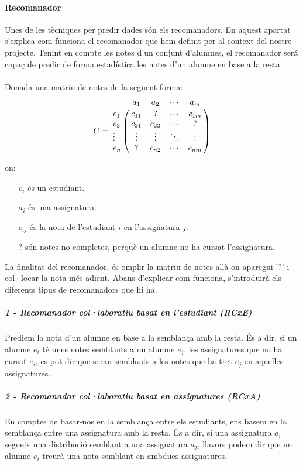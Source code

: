 \documentclass[12pt,a4paper,catalan]{article}
\begin{document}
\paragraph{Recomanador}
Unes de les tècniques per predir dades són els recomanadors. En aquest apartat s'explica com funciona el recomanador que hem definit per al context del nostre projecte. Tenint en compte les notes d'un conjunt d'alumnes, el recomanador será capaç de predir de forma estadística les notes d'un alumne en base a la resta.
\\
\\
Donada una matriu de notes de la següent forma:
$$
C = \bordermatrix{~ &         a_1   &    a_2   &   \cdots    &    a_m  \cr
                  e_1    &  c_{11}  &     ?    &   \cdots    &  c_{1m} \cr
                  e_2    &  c_{21}  &  c_{22}  &   \cdots    &    ?    \cr
                  \vdots &  \vdots  &  \vdots  &   \ddots    &  \vdots \cr
                  e_n    &    ?     &  c_{n2}  &   \cdots    &  c_{nm} \cr
                  }
$$

on:
\begin{itemize}[leftmargin=.5in]
	\item [$e_i$] és un estudiant.
	\item [$a_i$] és una assignatura.
	\item [$c_{ij}$] és la nota de l'estudiant $i$ en l'assignatura $j$.
	\item [$?$] són notes no completes, perquè un alumne no ha cursat l'assignatura.
\end{itemize}

La finalitat del recomanador, és omplir la matriu de notes allà on aparegui '$?$' i col·locar la nota més adient. Abans d'explicar com funciona, s'introduirà els diferents tipus de recomanadors que hi ha.

\subparagraph{1 - Recomanador col·laboratiu basat en l'estudiant (RCxE)}
Prediem la nota d'un alumne en base a la semblança amb la resta. És a dir, si un alumne $e_i$ té unes notes semblants a un alumne $e_j$, les assignatures que no ha cursat $e_i$, es pot dir que seran semblants a les notes que ha tret $e_j$ en aquelles assignatures.

\subparagraph{2 - Recomanador col·laboratiu basat en assignatures (RCxA)}
En comptes de basar-nos en la semblança entre els estudiants, ens basem en la semblança entre una assignatura amb la resta. És a dir, si una assignatura $a_i$ segueix una distribució semblant a una assignatura $a_j$, llavors podem dir que un alumne $e_i$ treurà una nota semblant en ambdues assignatures.
\end{document}
